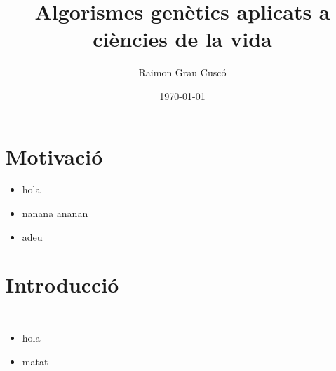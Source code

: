 \documentclass{beamer}
\begin{document}
\title{Algorismes genètics aplicats a ciències de la vida}
\author{Raimon Grau Cuscó}
\date{\today}


\frame{\titlepage} 


\section{Motivació} %
\label{sec:Motivacio}
\begin{itemize}
	\item hola
	\item nanana ananan
	\item adeu
\end{itemize}


\section{Introducció} %

\begin{frame}
	\begin{columns}[c]
		\begin{itemize}
			\item hola
				\pause
			\item matat
		\end{itemize}
	\end{columns}
\end{frame}
\end{document}
